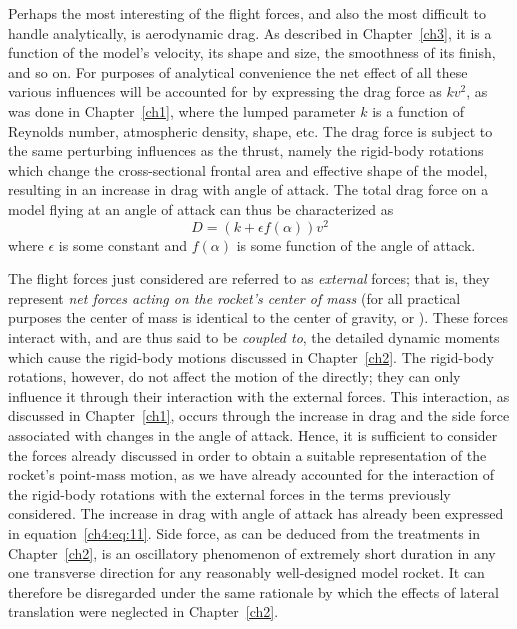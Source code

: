 Perhaps the most interesting of the flight forces, and also the most difficult to handle
analytically, is aerodynamic drag. As described in Chapter~\ref{ch3}, it is a function of the
model's velocity, its shape and size, the smoothness of its finish, and so on. For purposes of
analytical convenience the net effect of all these various influences will be accounted for by
expressing the drag force as $kv^{2}$, as was done in Chapter~\ref{ch1}, where the lumped parameter
$k$ is a function of Reynolds number, atmospheric density, shape, etc. The drag force is subject to
the same perturbing influences as the thrust, namely the rigid-body rotations which change the
cross-sectional frontal area and effective shape of the model, resulting in an increase in drag
with angle of attack. The total drag force on a model flying at an angle of attack can thus be
characterized as
\begin{equation}\label{ch4:eq:11}
D = (k + \epsilon f(\alpha))v^{2}
\end{equation}
where $\epsilon$ is some constant and $f(\alpha)$ is some function of the angle of attack.

The flight forces just considered are referred to as \emph{external} forces; that is, they
represent \emph{net forces acting on the rocket's center of mass} (for all practical purposes the
center of mass is identical to the center of gravity, or \CG). These forces interact with, and are
thus said to be \emph{coupled to}, the detailed dynamic moments which cause the rigid-body motions
discussed in Chapter~\ref{ch2}. The rigid-body rotations, however, do not affect the motion of the
\CG{} directly; they can only influence it through their interaction with the external forces. This
interaction, as discussed in Chapter~\ref{ch1}, occurs through the increase in drag and the side
force associated with changes in the angle of attack. Hence, it is sufficient to consider the
forces already discussed in order to obtain a suitable representation of the rocket's point-mass
motion, as we have already accounted for the interaction of the rigid-body rotations with the
external forces in the terms previously considered. The increase in drag with angle of attack has
already been expressed in equation~\eqref{ch4:eq:11}. Side force, as can be deduced from the
treatments in Chapter~\ref{ch2}, is an oscillatory phenomenon of extremely short duration in any one
transverse direction for any reasonably well-designed model rocket. It can therefore be disregarded
under the same rationale by which the effects of lateral translation were neglected in
Chapter~\ref{ch2}.

